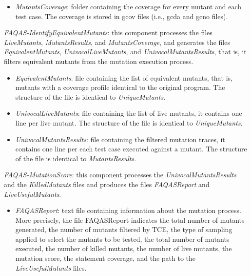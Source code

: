 \begin{itemize}
{\begin{itemize}
\begin{itemize}
				
				\item \textit{MutantsCoverage}: folder containing the coverage for every mutant and each test case. The coverage is stored in gcov files (i.e., gcda and gcno files).
			\end{itemize}
		\end{itemize}

	\item \textit{FAQAS-IdentifyEquivalentMutants}: this component processes the files \textit{LiveMutants}, \textit{MutantsResults}, and \textit{MutantsCoverage}, and generates the files \textit{EquivalentMutants}, \textit{UnivocalLiveMutants}, and \textit{UnivocalMutantsResults}, that is, it filters equivalent mutants from the mutation execution process.
	\begin{itemize}
		\item \textit{EquivalentMutants}: file containing the list of equivalent mutants, that is, mutants with a coverage profile identical to the original program. The structure of the file is identical to \textit{UniqueMutants}.
		\item \textit{UnivocalLiveMutants}: file containing the list of live mutants, it contains one line per live mutant. The structure of the file is identical to \textit{UniqueMutants}.
		\item \textit{UnivocalMutantsResults}: file containing the filtered mutation traces, it contains one line per each test case executed against a mutant. The structure of the file is identical to \textit{MutantsResults}.

	\end{itemize}

	\item \textit{FAQAS-MutationScore}: this component processes the \textit{UnivocalMutantsResults} and the \textit{KilledMutants} files and produces the files \textit{FAQASReport} and \textit{LiveUsefulMutants}.

	\begin{itemize}
		\item \textit{FAQASReport}: text file containing information about the \MASS mutation process. More precisely, the file FAQASReport indicates the total number of mutants generated, the number of mutants filtered by TCE, the type of sampling applied to select the mutants to be tested, the total number of mutants executed, the number of killed mutants, the number of live mutants, the mutation score, the statement coverage, and the  path to the \textit{LiveUsefulMutants} files.
		

\end{itemize}}
\end{itemize}
